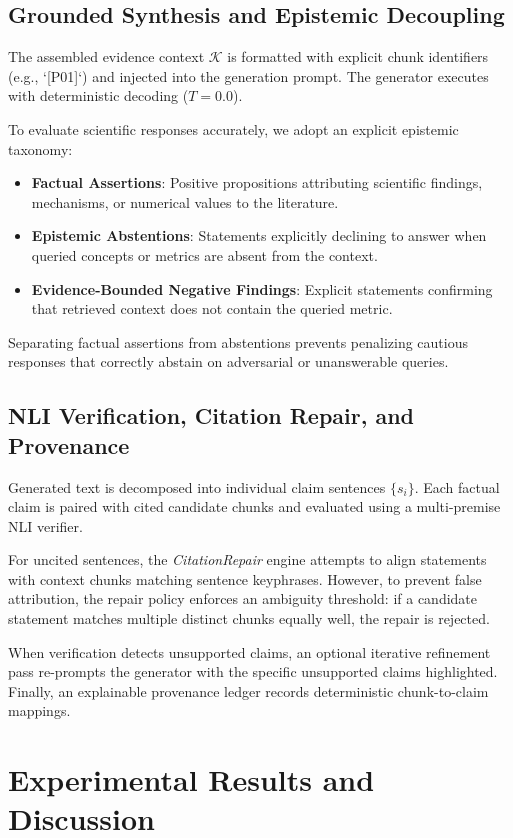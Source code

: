 \documentclass[conference]{IEEEtran}
\begin{document}
\subsection{Grounded Synthesis and Epistemic Decoupling}
The assembled evidence context $\mathcal{K}$ is formatted with explicit chunk identifiers (e.g., `[P01]`) and injected into the generation prompt. The generator executes with deterministic decoding ($T=0.0$). 

To evaluate scientific responses accurately, we adopt an explicit epistemic taxonomy:
\begin{itemize}
    \item \textbf{Factual Assertions}: Positive propositions attributing scientific findings, mechanisms, or numerical values to the literature.
    \item \textbf{Epistemic Abstentions}: Statements explicitly declining to answer when queried concepts or metrics are absent from the context.
    \item \textbf{Evidence-Bounded Negative Findings}: Explicit statements confirming that retrieved context does not contain the queried metric.
\end{itemize}
Separating factual assertions from abstentions prevents penalizing cautious responses that correctly abstain on adversarial or unanswerable queries.

\subsection{NLI Verification, Citation Repair, and Provenance}
Generated text is decomposed into individual claim sentences $\{s_i\}$. Each factual claim is paired with cited candidate chunks and evaluated using a multi-premise NLI verifier. 

For uncited sentences, the \textit{CitationRepair} engine attempts to align statements with context chunks matching sentence keyphrases. However, to prevent false attribution, the repair policy enforces an ambiguity threshold: if a candidate statement matches multiple distinct chunks equally well, the repair is rejected.

When verification detects unsupported claims, an optional iterative refinement pass re-prompts the generator with the specific unsupported claims highlighted. Finally, an explainable provenance ledger records deterministic chunk-to-claim mappings.

\section{Experimental Results and Discussion}
\end{document}
